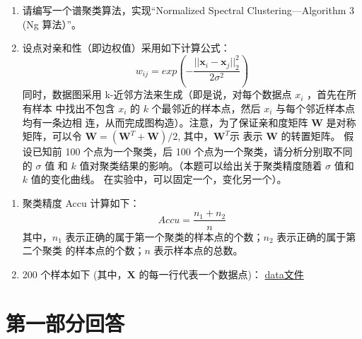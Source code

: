 \documentclass[a4paper,11pt,onecolumn,oneside,UTF8]{article}
\begin{document}
\begin{enumerate}
            \begin{enumerate}[(1). ]
                  \item 请编写一个谱聚类算法，实现“Normalized Spectral Clustering—Algorithm 3 (Ng 算法）”。
                  \item 设点对亲和性（即边权值）采用如下计算公式：
                        $$
                              w_{ij}=exp\left(-\frac{||\bm x_i-\bm x_j||_2^2}{2\sigma^2}\right)
                        $$
                        同时，数据图采用 k-近邻方法来生成（即是说，对每个数据点 $x_i$ ，首先在所有样本
                        中找出不包含 $x_i$ 的 $k$ 个最邻近的样本点，然后 $x_i$ 与每个邻近样本点均有一条边相
                        连，从而完成图构造）。注意，为了保证亲和度矩阵 $\bm W$  是对称矩阵，可以令
                        $\bm W=(\bm W^T+\bm W)/2$, 其中，$\bm W^T$示 表示 $\bm W$ 的转置矩阵。
                        假设已知前 100 个点为一个聚类，后 100 个点为一个聚类，请分析分别取不同的 $\sigma$ 值
                        和 $k$ 值对聚类结果的影响。（本题可以给出关于聚类精度随着 $\sigma$ 值和 $k$ 值的变化曲线。
                        在实验中，可以固定一个，变化另一个）。
            \end{enumerate}

\end{enumerate}

\begin{enumerate}[附注1：]
      \item  聚类精度 Accu 计算如下：
            $$
                  Accu=\frac{n_1+n_2}{n}
            $$
            其中，$n_1$ 表示正确的属于第一个聚类的样本点的个数；$n_2$ 表示正确的属于第二个聚类
            的样本点的个数；$n$ 表示样本点的总数。
      \item 200 个样本如下 (其中，$\bm X$ 的每一行代表一个数据点)：
            \href{https://github.com/Allenem/PatternRecognition/blob/main/hw5/data_hw5.txt}{data文件}
\end{enumerate}


\section*{第一部分回答}
\end{document}
